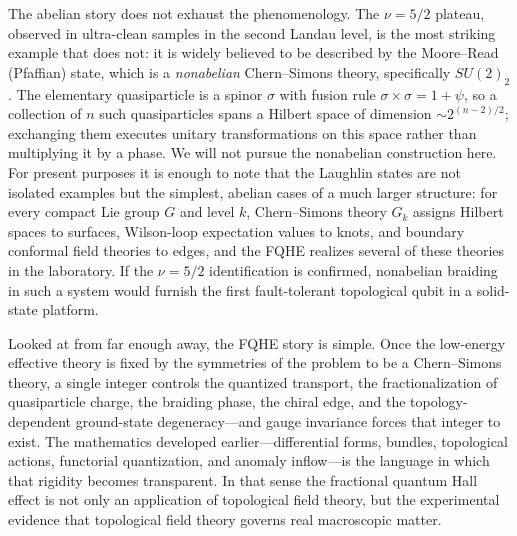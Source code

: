 The abelian story does not exhaust the phenomenology. The $\nu=5/2$ plateau, observed in ultra-clean samples in the second Landau level, is the most striking example that does not: it is widely believed to be described by the Moore--Read (Pfaffian) state, which is a \emph{nonabelian} Chern--Simons theory, specifically $SU(2)_{2}$. The elementary quasiparticle is a spinor $\sigma$ with fusion rule $\sigma\times\sigma = 1 + \psi$, so a collection of $n$ such quasiparticles spans a Hilbert space of dimension $\sim 2^{(n-2)/2}$; exchanging them executes unitary transformations on this space rather than multiplying it by a phase. We will not pursue the nonabelian construction here. For present purposes it is enough to note that the Laughlin states are not isolated examples but the simplest, abelian cases of a much larger structure: for every compact Lie group $G$ and level $k$, Chern--Simons theory $G_k$ assigns Hilbert spaces to surfaces, Wilson-loop expectation values to knots, and boundary conformal field theories to edges, and the FQHE realizes several of these theories in the laboratory. If the $\nu=5/2$ identification is confirmed, nonabelian braiding in such a system would furnish the first fault-tolerant topological qubit in a solid-state platform.

\medskip

Looked at from far enough away, the FQHE story is simple. Once the low-energy effective theory is fixed by the symmetries of the problem to be a Chern--Simons theory, a single integer controls the quantized transport, the fractionalization of quasiparticle charge, the braiding phase, the chiral edge, and the topology-dependent ground-state degeneracy---and gauge invariance forces that integer to exist. The mathematics developed earlier---differential forms, bundles, topological actions, functorial quantization, and anomaly inflow---is the language in which that rigidity becomes transparent. In that sense the fractional quantum Hall effect is not only an application of topological field theory, but the experimental evidence that topological field theory governs real macroscopic matter.
